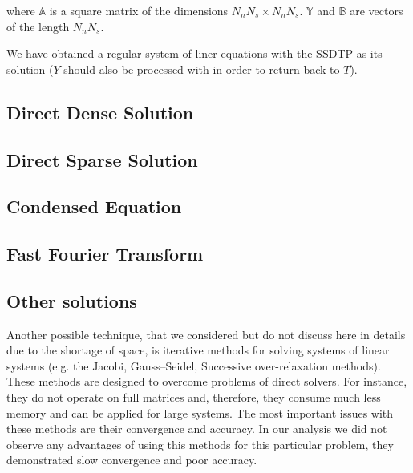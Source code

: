 where $\mathbb{A}$ is a square matrix of the dimensions $N_n N_s \times N_n N_s$. $\mathbb{Y}$ and $\mathbb{B}$ are vectors of the length $N_n N_s$.

We have obtained a regular system of liner equations with the SSDTP as its solution ($Y$ should also be processed with  in order to return back to $T$).

\subsection{Direct Dense Solution}


\subsection{Direct Sparse Solution}


\subsection{Condensed Equation}


\subsection{Fast Fourier Transform}


\subsection{Other solutions}
Another possible technique, that we considered but do not discuss here in details due to the shortage of space, is iterative methods for solving systems of linear systems (e.g. the Jacobi, Gauss–Seidel, Successive over-relaxation methods). These methods are designed to overcome problems of direct solvers. For instance, they do not operate on full matrices and, therefore, they consume much less memory and can be applied for large systems. The most important issues with these methods are their convergence and accuracy. In our analysis we did not observe any advantages of using this methods for this particular problem, they demonstrated slow convergence and poor accuracy.
